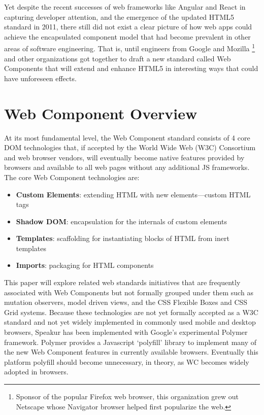 Yet despite the recent successes of web frameworks like Angular and React in capturing developer attention, 
and the emergence of the updated HTML5 standard in 2011, 
there still did not exist a clear picture of how web apps could achieve the encapsulated component model that had become prevalent in other areas of software engineering.
That is, until engineers from Google 
and Mozilla  \footnote{Sponsor of the popular Firefox web browser, this organization grew out Netscape whose Navigator browser helped first popularize the web.}
and other organizations got together to draft a new standard called Web Components that will extend and enhance HTML5 in interesting ways that could have unforeseen effects.

\section{Web Component Overview}
At its most fundamental level, the Web Component standard consists of 4 core DOM technologies that, 
if accepted by the World Wide Web (W3C) 
Consortium and web browser vendors, 
will eventually become native features provided by browsers and available to all web pages without any additional JS frameworks. The core Web Component technologies are:
\begin{itemize}
\item
\textbf{Custom Elements}: extending HTML with new elements---custom HTML tags
\item
\textbf{Shadow DOM}: encapsulation for the internals of custom elements
\item
\textbf{Templates}: scaffolding for instantiating blocks of HTML from inert templates
\item
\textbf{Imports}: packaging for HTML components
\end{itemize}

This paper will explore related web standards initiatives that are frequently associated with Web Components 
but not formally grouped under them such as mutation observers,
model driven views, 
and the CSS Flexible Boxes
and CSS Grid
systems. 
Because these technologies are not yet formally accepted as a W3C standard and not yet widely implemented in commonly used mobile and desktop browsers, 
Speakur has been implemented with Google's experimental Polymer framework.
Polymer provides a Javascript `polyfill'
library to implement many of the new Web Component features in currently available browsers. 
Eventually this platform polyfill should become unnecessary, in theory, as WC becomes widely adopted in browsers.

